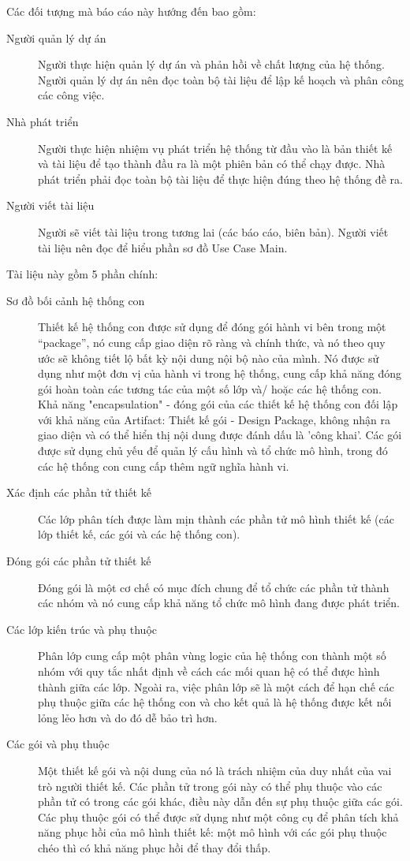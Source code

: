 \documentclass[./../main_file.tex]{subfiles}
\begin{document}
	Các đối tượng mà báo cáo này hướng đến bao gồm: 
	\begin{description}
		\item[Người quản lý dự án] Người thực hiện quản lý dự án và phản hồi về chất lượng của hệ thống. Người quản lý dự án nên đọc toàn bộ tài liệu để lập kế hoạch và phân công các công việc.
		\item[Nhà phát triển] Người thực hiện nhiệm vụ phát triển hệ thống từ đầu vào là bản thiết kế và tài liệu để tạo thành đầu ra là một phiên bản có thể chạy được. Nhà phát triển phải đọc toàn bộ tài liệu để thực hiện đúng theo hệ thống đề ra.
		\item[Người viết tài liệu] Người sẽ viết tài liệu trong tương lai (các báo cáo, biên bản). Người viết tài liệu nên đọc để hiểu phần sơ đồ Use Case Main.	
	\end{description}
	Tài liệu này gồm 5 phần chính:
	\begin{description}
		\item[Sơ đồ bối cảnh hệ thống con] Thiết kế hệ thống con được sử dụng để đóng gói hành vi bên trong một “package”, nó cung cấp giao diện rõ ràng và chính thức, và nó theo quy ước sẽ không tiết lộ bất kỳ nội dung nội bộ nào của mình. Nó được sử dụng như một đơn vị của hành vi trong hệ thống, cung cấp khả năng đóng gói hoàn toàn các tương tác của một số lớp và/ hoặc các hệ thống con. Khả năng "encapsulation" - đóng gói của các thiết kế hệ thống con đối lập với khả năng của Artifact: Thiết kế gói - Design Package, không nhận ra giao diện và có thể hiển thị nội dung được đánh dấu là 'công khai'. Các gói được sử dụng chủ yếu để quản lý cấu hình và tổ chức mô hình, trong đó các hệ thống con cung cấp thêm ngữ nghĩa hành vi. 
		\item[Xác định các phần tử thiết kế] Các lớp phân tích được làm mịn thành các phần tử mô hình thiết kế (các lớp thiết kế, các gói và các hệ thống con).
		\item[Đóng gói các phần tử thiết kế] Đóng gói là một cơ chế có mục đích chung để tổ chức các phần tử thành các nhóm và nó cung cấp khả năng tổ chức mô hình đang được phát triển. 
		\item[Các lớp kiến trúc và phụ thuộc] Phân lớp cung cấp một phân vùng logic của hệ thống con thành một số nhóm với quy tắc nhất định về cách các mối quan hệ có thể được hình thành giữa các lớp. Ngoài ra, việc phân lớp sẽ là một cách để hạn chế các phụ thuộc giữa các hệ thống con và cho kết quả là hệ thống được kết nối lỏng lẻo hơn và do đó dễ bảo trì hơn.
		\item[Các gói và phụ thuộc] Một thiết kế gói và nội dung của nó là trách nhiệm của duy nhất của vai trò người thiết kế. Các phần tử trong gói này có thể phụ thuộc vào các phần tử có trong các gói khác, điều này dẫn đến sự phụ thuộc giữa các gói. Các phụ thuộc gói có thể được sử dụng như một công cụ để phân tích khả năng phục hồi của mô hình thiết kế: một mô hình với các gói phụ thuộc chéo thì có khả năng phục hồi để thay đổi thấp.
	\end{description}
\end{document}
